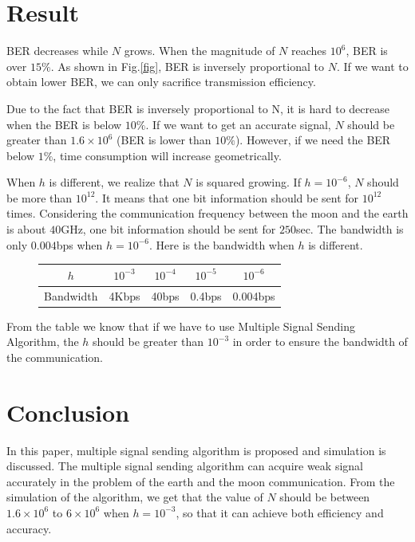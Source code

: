 \documentclass[conference]{IEEEtran}
\begin{document}
\section{Result}
BER decreases while $N$ grows. When the magnitude of $N$ reaches $10^{6}$, BER is over $15\%$. As shown in Fig.\ref{fig}, BER is inversely proportional to $N$. If we want to obtain lower BER, we can only sacrifice transmission efficiency. 

Due to the fact that BER is inversely proportional to N, it is hard to decrease when the BER is below $10\%$. If we want to get an accurate signal, $N$ should be greater than $1.6\times 10^{6}$ (BER is lower than $10\%$). However, if we need the BER below $1\%$, time consumption will increase geometrically.

When $h$ is different, we realize that $N$ is squared growing. If $h=10^{-6}$, $N$ should be more than $10^{12}$. It means that one bit information should be sent for $10^{12}$ times. Considering the communication frequency between the moon and the earth is about $40$GHz\cite{b6}, one bit information should be sent for $250$sec. The bandwidth is only $0.004$bps when $h=10^{-6}$. Here is the bandwidth when $h$ is different.
\begin{figure}[hbtp]
\centering
\vspace{-3mm}
\begin{tabular}{c|cccc}\hline\hline
$h$            & $10^{-3}$ & $10^{-4}$ & $10^{-5}$ & $10^{-6}$\\\hline
Bandwidth & 4Kbps & 40bps & 0.4bps & 0.004bps \\\hline\hline
\end{tabular}
\vspace{-3mm}
\end{figure}

From the table we know that if we have to use Multiple Signal Sending Algorithm, the $h$ should be greater than $10^{-3}$ in order to ensure the bandwidth of the communication.

\section{Conclusion}
In this paper, multiple signal sending algorithm is proposed and simulation is discussed. The multiple signal sending algorithm can acquire weak signal accurately in the problem of the earth and the moon communication. From the simulation of the algorithm, we get that the value of $N$ should be between $1.6\times 10^{6}$ to $6\times 10^{6}$ when $h=10^{-3}$, so that it can achieve both efficiency and accuracy.
\end{document}
